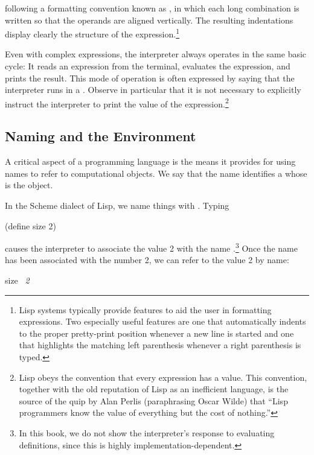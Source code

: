 \noindent
following a formatting convention known as , in which
each long combination is written so that the operands are aligned vertically.
The resulting indentations display clearly the structure of the
expression.\footnote{Lisp systems typically provide features to aid the user in
formatting expressions.  Two especially useful features are one that
automatically indents to the proper pretty-print position whenever a new line
is started and one that highlights the matching left parenthesis whenever a
right parenthesis is typed.}

Even with complex expressions, the interpreter always operates in the same
basic cycle: It reads an expression from the terminal, evaluates the
expression, and prints the result.  This mode of operation is often expressed
by saying that the interpreter runs in a .
Observe in particular that it is not necessary to explicitly instruct the
interpreter to print the value of the expression.\footnote{Lisp obeys the
convention that every expression has a value. This convention, together with
the old reputation of Lisp as an inefficient language, is the source of the
quip by Alan Perlis (paraphrasing Oscar Wilde) that ``Lisp programmers know the
value of everything but the cost of nothing.''}

\subsection{Naming and the Environment}
\label{Section 1.1.2}

A critical aspect of a programming language is the means it provides for using
names to refer to computational objects.  We say that the name identifies a
 whose  is the object.

In the Scheme dialect of Lisp, we name things with .  Typing

\begin{codeBlock}
(define size 2)
\end{codeBlock}

\noindent
causes the interpreter to associate the value 2 with the name
.\footnote{In this book, we do not show the interpreter's response
to evaluating definitions, since this is highly implementation-dependent.} Once
the name  has been associated with the number 2, we can refer to the
value 2 by name:

\begin{codeBlock}
size
~\textit{2}~
\end{codeBlock}

